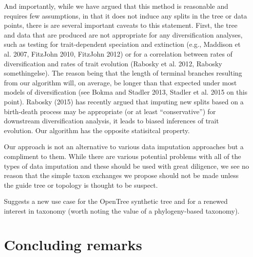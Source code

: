 \documentclass[a4paper,11pt]{article}
\begin{document}
And importantly, while we have argued that this method is reasonable and requires few assumptions, in that it does not induce any splits in the tree or data points, there is are several important caveats to this statement. First, the tree and data that are produced are not appropriate for any diversification analyses, such as testing for trait-dependent speciation and extinction (e.g., Maddison et al. 2007, FitzJohn 2010, FitzJohn 2012) or for a correlation between rates of diversification and rates of trait evolution (Rabosky et al. 2012, Rabosky somethingelse). The reason being that the length of terminal branches resulting from our algorithm will, on average, be longer than that expected under most models of diversification (see Bokma and Stadler 2013, Stadler et al. 2015 on this point). Rabosky (2015) has recently argued that imputing new splits based on a birth-death process may be appropriate (or at least ``conservative'') for downstream diversification analysis, it leads to biased inferences of trait evolution. Our algorithm has the opposite statisitcal property. 

Our approach is not an alternative to various data imputation approaches but a compliment to them. While there are various potential problems with all of the types of data imputation and these should be used with great diligence, we see no reason that the simple taxon exchanges we propose should not be made unless the guide tree or topology is thought to be suspect.

Suggests a new use case for the OpenTree synthetic tree and for a renewed interest in taxonomy (worth noting the value of a phylogeny-based taxonomy).

\section{Concluding remarks}
\end{document}

